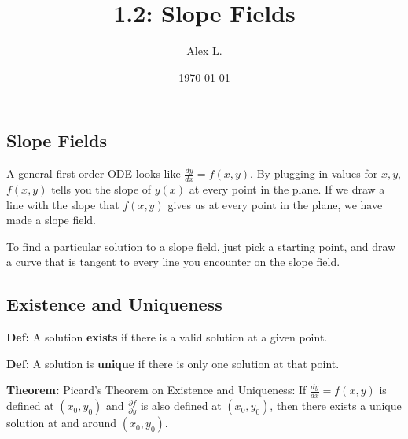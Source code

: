 \documentclass{article}
\title{1.2: Slope Fields}
\author{Alex L.}
\date{\today}
\begin{document}
\maketitle

\subsection{Slope Fields}

A general first order ODE looks like $\frac{dy}{dx} = f(x,y)$. By plugging in values for $x,y$, $f(x,y)$ tells you the slope of $y(x)$ at every point in the plane. If we draw a line with the slope that $f(x,y)$ gives us at every point in the plane, we have made a slope field.

To find a particular solution to a slope field, just pick a starting point, and draw a curve that is tangent to every line you encounter on the slope field.

\subsection{Existence and Uniqueness}

\textbf{Def:} A solution \textbf{exists} if there is a valid solution at a given point.

\textbf{Def:} A solution is \textbf{unique} if there is only one solution at that point.

\textbf{Theorem:} Picard's Theorem on Existence and Uniqueness: If $\frac{dy}{dx} = f(x,y)$ is defined at $(x_0,y_0)$ and $\frac{\partial f}{\partial y}$ is also defined at $(x_0,y_0)$, then there exists a unique solution at and around $(x_0,y_0)$.
\end{document}
